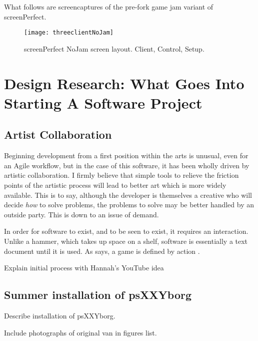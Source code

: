 What follows are screencaptures of the pre-fork game jam variant of screenPerfect.

\begin{figure}[h]
  \caption{screenPerfect NoJam screen layout. Client, Control, Setup.}
  \centering
    \texttt{[image: threeclientNoJam]}
\end{figure}

\section{Design Research: What Goes Into Starting A Software Project}

\subsection{Artist Collaboration}

Beginning development from a first position within the arts is unusual, even for an Agile workflow, but in the case of this software, it has been wholly driven by artistic collaboration. I firmly believe that simple tools to relieve the friction points of the artistic process will lead to better art which is more widely available. This is to say, although the developer is themselves a creative who will decide \textit{how} to solve problems, the problems to solve may be better handled by an outside party. This is down to an issue of demand. 

In order for software to exist, and to be seen to exist, it requires an interaction. Unlike a hammer, which takes up space on a shelf, software is essentially a text document until it is used. As \citeauthor{galloway}says, a game is defined by action \citeyear{galloway}. \cite{galloway}


\item[\tiny{$\blacksquare$}] Explain initial process with Hannah's YouTube idea

\subsection{Summer installation of psXXYborg}
\item[\tiny{$\blacksquare$}] Describe installation of psXXYborg.
\item[\tiny{$\blacksquare$}] Include photographs of original van in figures list.

